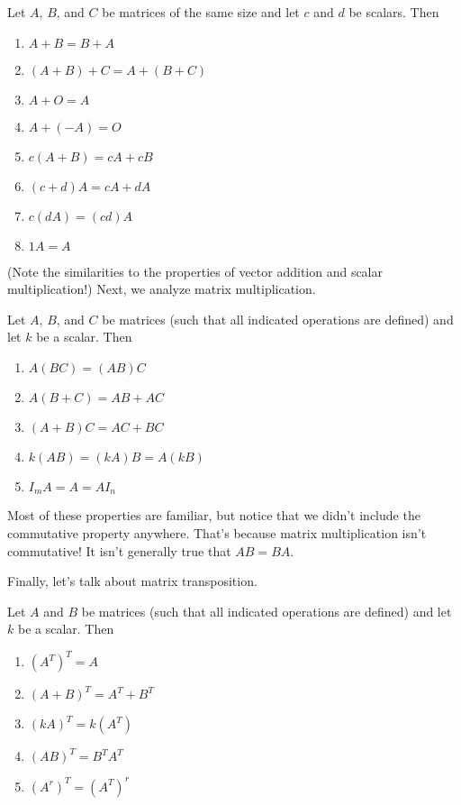 \documentclass[../m73main.tex]{subfiles}
\begin{document}
\begin{theorem}
	Let $A$, $B$, and $C$ be matrices of the same size and let $c$ and $d$ be scalars.
	Then
	\begin{enumerate}[label=(\alph*)]
		\item $A + B = B + A$
		\item $(A + B) + C = A + (B + C)$
		\item $A + O = A$
		\item $A + (-A) = O$
		\item $c(A + B) = cA + cB$
		\item $(c+d)A = cA + dA$
		\item $c(dA) = (cd)A$
		\item $1A = A$
	\end{enumerate}
\end{theorem}

(Note the similarities to the properties of vector addition and scalar multiplication!)
Next, we analyze matrix multiplication.

\begin{theorem}
	Let $A$, $B$, and $C$ be matrices (such that all indicated operations are defined) and let $k$ be a scalar.
	Then
	\begin{enumerate}[label=(\alph*)]
		\item $A(BC) = (AB)C$
		\item $A(B+C) = AB+AC$
		\item $(A+B)C = AC+BC$
		\item $k(AB) = (kA)B = A(kB)$
		\item $I_mA = A = AI_n$
	\end{enumerate}
\end{theorem}

Most of these properties are familiar, but notice that we didn't include the commutative property anywhere.
That's because matrix multiplication isn't commutative!
It isn't generally true that $AB = BA$.

Finally, let's talk about matrix transposition.

\begin{theorem}
	Let $A$ and $B$ be matrices (such that all indicated operations are defined) and let $k$ be a scalar.
	Then
	\begin{enumerate}[label=(\alph*)]
		\item $(A^T)^T = A$
		\item $(A+B)^T = A^T + B^T$
		\item $(kA)^T = k(A^T)$
		\item $(AB)^T = B^TA^T$
		\item $(A^r)^T = (A^T)^r$
	\end{enumerate}
\end{theorem}
\end{document}
